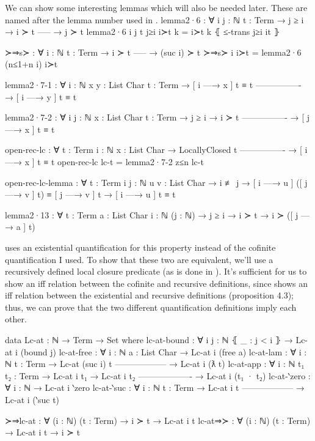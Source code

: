 \documentclass[logo,bsc,singlespacing,parskip,online]{infthesis}
\renewenvironment{code}{\mintedcopy[breaklines,breaksymbolleft=\;]{agda}}{\endmintedcopy}
\begin{document}
We can show some interesting lemmas which will also be needed later. These are named after the lemma
number used in \citet{pitts_locally_2023}.
\begin{code}
lemma2·6 : ∀ {i j : ℕ} {t : Term}
  → j ≥ i
  → i ≻ t
    -----
  → j ≻ t
lemma2·6 {i} {j} {t} j≥i i≻t k = i≻t k ⦃ ≤-trans j≥i it ⦄

≻⇒s≻ : ∀ {i : ℕ} {t : Term}
  → i ≻ t
    -----
  → (suc i) ≻ t
≻⇒s≻ {i} i≻t = lemma2·6 (n≤1+n i) i≻t

lemma2·7-1 : ∀ {i : ℕ} {x y : List Char} {t : Term}
  → [ i —→ x ] t ≡ t
    ----------------
  → [ i —→ y ] t ≡ t

lemma2·7-2 : ∀ {i j : ℕ} {x : List Char} {t : Term}
  → j ≥ i
  → i ≻ t
    ----------------
  → [ j —→ x ] t ≡ t

open-rec-lc : ∀ {t : Term} {i : ℕ} {x : List Char}
  → LocallyClosed t
    ----------------
  → [ i —→ x ] t ≡ t
open-rec-lc lc-t = lemma2·7-2 z≤n lc-t

open-rec-lc-lemma : ∀ {t : Term} {i j : ℕ} {u v : List Char}
  → i ≢ j
  → [ i —→ u ] ([ j —→ v ] t) ≡ [ j —→ v ] t
  → [ i —→ u ] t ≡ t

lemma2·13 : ∀ {t : Term} {a : List Char} {i : ℕ} (j : ℕ)
  → j ≥ i
  → i ≻ t
  → i ≻ ([ j —→ a ] t)
\end{code}

\citet{pitts_locally_2023} uses an existential quantification for this property instead of the
cofinite quantification I used. To show that these two are equivalent, we'll use a recursively
defined local closure predicate (as is done in \citet{chargueraud_locally_2012}). It's sufficient
for us to show an iff relation between the cofinite and recursive definitions, since
\citet{pitts_locally_2023} shows an iff relation between the existential and recursive definitions
(proposition 4.3); thus, we can prove that the two different quantification definitions imply each
other.

\begin{code}
data Lc-at : ℕ → Term → Set where
  lc-at-bound : ∀ {i j : ℕ} ⦃ _ : j < i ⦄ → Lc-at i (bound j)
  lc-at-free : ∀ {i : ℕ} {a : List Char} → Lc-at i (free a)
  lc-at-lam : ∀ {i : ℕ} {t : Term}
    → Lc-at (suc i) t
      ------------------
    → Lc-at i (ƛ t)
  lc-at-app : ∀ {i : ℕ} {t₁ t₂ : Term}
    → Lc-at i t₁
    → Lc-at i t₂
      -------------------
    → Lc-at i (t₁ · t₂)
  lc-at-‵zero : ∀ {i : ℕ} → Lc-at i ‵zero
  lc-at-‵suc : ∀ {i : ℕ} {t : Term}
    → Lc-at i t
      ------------------
    → Lc-at i (‵suc t)

≻⇒lc-at : ∀ (i : ℕ) (t : Term) → i ≻ t → Lc-at i t
lc-at⇒≻ : ∀ (i : ℕ) (t : Term) → Lc-at i t → i ≻ t
\end{code}
\end{document}
